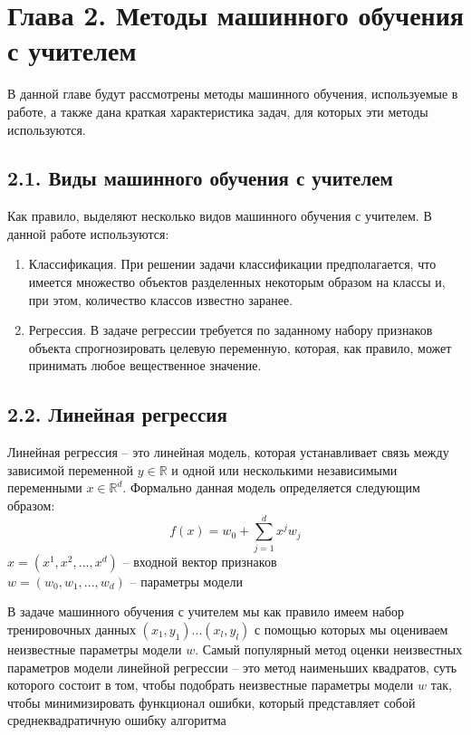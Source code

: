 \section{Глава 2. Методы машинного обучения с учителем}

В данной главе будут рассмотрены методы машинного обучения, используемые в работе, а также дана краткая характеристика задач, для которых эти методы используются.

\subsection{2.1. Виды машинного обучения с учителем}
Как правило, выделяют несколько видов машинного обучения с учителем. В данной работе используются:
\begin{enumerate}
\item Классификация. При решении задачи классификации предполагается, что имеется множество объектов разделенных некоторым образом на классы и, при этом, количество классов известно заранее.
\item Регрессия. В задаче регрессии требуется по заданному набору признаков объекта спрогнозировать целевую переменную, которая, как правило, может принимать любое вещественное значение.
\end{enumerate}

\subsection{2.2. Линейная регрессия}

Линейная регрессия \cite{linear regression} -- это линейная модель, которая устанавливает связь между зависимой переменной $y \in \mathbb{R}$ и одной или несколькими независимыми переменными $x \in \mathbb{R}^d$. Формально данная модель определяется следующим образом:
$$f(x)=w_0 + \sum_{j=1}^{d}x^j w_j$$
$x = (x^1, x^2, ..., x^d)$ -- входной вектор признаков \\
$w = (w_0, w_1, ... ,w_d)$ -- параметры модели

В задаче машинного обучения с учителем мы как правило имеем набор тренировочных данных $(x_1, y_1) ... (x_l,  y_l)$ с помощью которых мы оцениваем неизвестные параметры модели $w$. Самый популярный метод оценки неизвестных параметров модели линейной регрессии -- это метод наименьших квадратов, суть которого состоит в том, чтобы подобрать неизвестные параметры модели $w$ так, чтобы минимизировать функционал ошибки, который представляет собой среднеквадратичную ошибку алгоритма

